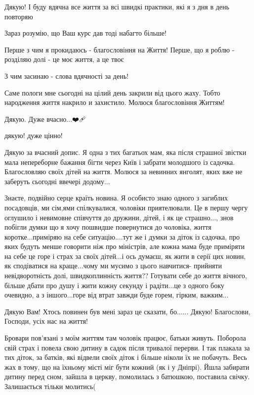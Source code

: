 \begin{itemize}

Дякую! І буду вдячна все життя за всі швидкі практики, які я з дня в день
повторяю🙏

Зараз розумію, що Ваш курс дав тоді набагто більше!

Перше з чим я прокидаюсь - благословіння на Життя! Перше, що я роблю - розділяю
долі - це моє життя, а це твоє🙏

З чим засинаю - слова вдячності за день!


Саме пологи мне сьогодні на цілий день закрили від цього жаху. Тобто народження
життя накрило и захистило. Молюся благословіння Життям!


Дякую. Дуже вчасно...❤️🩹


дякую! дуже цінно!


Дякую за вчасний допис. Я одна з тих багатьох мам, яка після страшної звістки
мала непереборне бажання бігти через Київ і забрати молодшого із садочка.
Благословляю своїх дітей на життя. Молюся за невинних янголят, яких вже не
заберуть сьогодні ввечері додому...


Знаєте, подвійно серце країть новина. Я особисто знаю одного з загиблих
посадовців, ми сім,ями спілкувалися, чоловіки приятелювали. Це в першу чергу
оглушило і невимовне співчуття до дружини, дітей, і як це страшно..., знов
побігли думки що я хочу пошвидше повернутися до чоловіка, життя
коротке...приміряю на себе ситуацію....тут же і думки за діток із садочка, про
яких будуть менше говорити ніж про міністрів, але кожна мама буде приміряти на
себе це горе і страх за своїх дітей...і ось думаєш, як жити в серії цих новин,
як сподіватися на краще...чому ми мусимо з цього навчитися- прийняти
невідворотність долі, швидкоплинність життя?? Готувати себе до життя вічного,
більше дбати про душу і жити кожну секунду і радіти...це з одного боку
очевидно, а з іншого...горе від втрат завжди буде горем, гірким, важким...


Дякую Вам! Хтось повинен був мені зараз це сказати, бо......
Дякую! Благослови, Господи, усіх нас на життя!


Бровари пов'язані з моїм життям там чоловік працює, батьки живуть. Поборола
свій страх і повела свою дитину в садок після тривалої перерви. І так плакала
за тих діток, за батків, які відвели своїх діток і більше ніколи їх не
побачуть. Весь жах в тому, що на їхньому місті міг бути кожний (як і у Дніпрі).
Йшла забирати дитину перед сном, зайшла в церкву, помолилась з батюшкою,
поставила свічку. Залишається тільки молитись(


\end{itemize}
